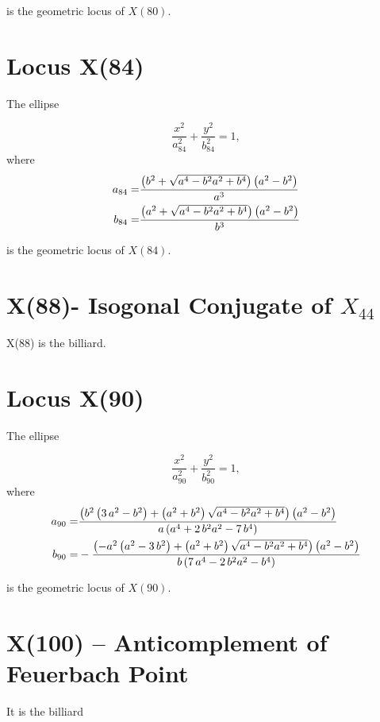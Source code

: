 \documentclass[11pt]{amsart}
\theoremstyle{plain}
\theoremstyle{definition}
\begin{document}
      is the geometric locus of $X(80)$.
         \section{Locus X(84) }
      
      
      The ellipse 
      
      \[ \frac{x^2}{a_{84}^2}+\frac{y^2}{b_{84}^2}=1, \]
      where
      \[   \aligned
      a_{ 84}=&   {\frac { \left( {b}^{2}+\sqrt {{a}^{4}-{b}^{2}{a}^{2}+{b}^{4}}
      		\right)  \left( a^2-b^2 \right)    }{{a}^{3}}}
      \\
      b_{84}=&  {\frac { \left( {a}^{2}+\sqrt {{a}^{4}-{b}^{2}{a}^{2}+{b}^{4}}
      		\right)  \left( {a}^{2}-{b}^{2} \right) }{{b}^{3}}}
      \endaligned
      \]
      
      is the geometric locus of $X(84)$.
      
      
      \section{ X(88)- Isogonal Conjugate of $X_{44}$}
      
      X(88) is the billiard.
      
%      
%      
%      
     \section{Locus X(90) }
     
     
     The ellipse 
     
     \[ \frac{x^2}{a_{90}^2}+\frac{y^2}{b_{90}^2}=1, \]
     where
     \[   \aligned
     a_{ 90}=&   {\frac { \left( {b}^{2} \left( 3\,{a}^{2}-{b}^{2} \right) + \left( {a}
     		^{2}+{b}^{2} \right) \sqrt {{a}^{4}-{b}^{2}{a}^{2}+{b}^{4}} \right) 
     		\left( {a}^{2}-{b}^{2} \right) }{a \left( {a}^{4}+2\,{b}^{2}{a}^{2}-7
     		\,{b}^{4} \right) }}
      \\
     b_{90}=& -{\frac { \left( -{a}^{2} \left( {a}^{2}-3\,{b}^{2} \right) + \left( {
     			a}^{2}+{b}^{2} \right) \sqrt {{a}^{4}-{b}^{2}{a}^{2}+{b}^{4}} \right) 
     		\left( {a}^{2}-{b}^{2} \right) }{b \left( 7\,{a}^{4}-2\,{b}^{2}{a}^{2
     		}-{b}^{4} \right) }}
     \endaligned
     \]
     
     is the geometric locus of $X(90)$.
     
     
     \section{X(100) -- Anticomplement of Feuerbach Point}
     
     It is the billiard
\end{document}

